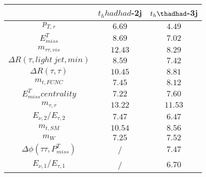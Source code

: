 \centering
\begin{tabular}{|c|c|c|} \hline
  & $t_h	hadhad$-2j & $t_h\thadhad$-3j \\\hline
$p_{T,\tau }$ & $6.69$ & $4.49$\\\hline
$E^{T}_{miss}$ & $8.69$ & $7.02$\\\hline
$m_{\tau \tau ,vis}$ & $12.43$ & $8.29$\\\hline
$\Delta R(\tau ,light~jet,min)$ & $8.59$ & $7.42$\\\hline
$\Delta R(\tau ,\tau )$ & $10.45$ & $8.81$\\\hline
$m_{t,FCNC}$ & $7.45$ & $8.12$\\\hline
$E^{T}_{miss} centrality$ & $7.22$ & $7.60$\\\hline
$m_{\tau ,\tau }$ & $13.22$ & $11.53$\\\hline
$E_{\nu,2}/E_{\tau ,2}$ & $7.47$ & $6.47$\\\hline
$m_{t,SM}$ & $10.54$ & $8.56$\\\hline
$m_{W}$ & $7.25$ & $7.52$\\\hline
$\Delta\phi(\tau \tau ,P^{T}_{miss})$ &  / & $7.47$\\\hline
$E_{\nu,1}/E_{\tau ,1}$ &  / & $6.70$\\\hline
\end{tabular}
